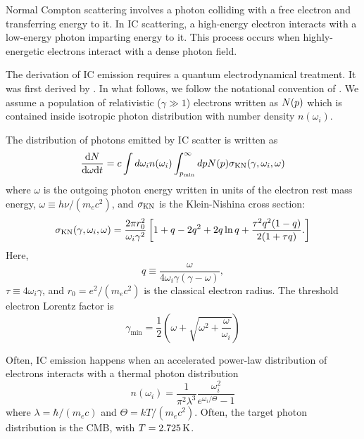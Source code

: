Normal Compton scattering involves a photon colliding with a free electron
and transferring energy to it. In \ac{IC} scattering, a high-energy 
electron interacts with a low-energy photon imparting energy to it.
This process occurs when highly-energetic electrons interact with
a dense photon field.

The derivation of \Ac{IC} emission requires a quantum
electrodynamical treatment. It was first derived by
\cite{klein_1929a_streuung-strahlung}. In what follows, we follow the
notational convention of \cite{houck_2006a_models-nonthermal}.
We assume a population of relativistic ($\gamma\gg1$) electrons
written as $N(p)$ which is contained inside isotropic 
photon distribution with number density $n(\omega_i)$.

The distribution of photons 
emitted by \ac{IC} scatter is
written as
\begin{equation}
  \frac{\text{d}N}{\text{d}\omega\text{d}t} = 
  c \int d \omega_i n(\omega_i)
  \int_{p_\text{min}}^\infty  dp
  N(p) 
 \sigma_\text{KN}(\gamma,\omega_i,\omega)
\end{equation}
where $\omega$ is the outgoing photon energy written
in units of the electron rest mass energy, $\omega\equiv h\nu/(m_e c^2)$,
and $\sigma_\text{KN}$ is the Klein-Nishina cross section:
\begin{equation}
\sigma_\text{KN}(\gamma,\omega_i,\omega) = \frac{2\pi r_0^2}{\omega_i \gamma^2}
  \left[
  1 + q - 2q^2 + 2q\ln q + \frac{\tau^2 q^2 (1-q)}{2(1+\tau q)}.
  \right]
\end{equation}
Here,
\begin{equation}
  q \equiv \frac{\omega}{4 \omega_i \gamma (\gamma-\omega)},
\end{equation}
$\tau \equiv 4\omega_i \gamma$, and $r_0 = e^2/(m_e c^2)$ is the classical
electron radius.
The threshold electron Lorentz factor is
\begin{equation}
  \gamma_\text{min} =
  \frac{1}{2} 
  \left(
  \omega + \sqrt{\omega^2 + \frac{\omega}{\omega_i}}
  \right)
\end{equation}

Often, \ac{IC} emission happens when an accelerated power-law distribution
of electrons interacts with a thermal photon distribution
\begin{equation}
  n(\omega_i) = 
  \frac{1}{\pi^2\lambda^3} 
  \frac{\omega_i^2}{e^{\omega_i/\Theta} -1}
\end{equation}
where $\lambda=\hbar/(m_e c)$ and $\Theta=kT/(m_e c^2)$.
Often, the target photon distribution is the \ac{CMB}, with
$T=2.725\,\text{K}$.

